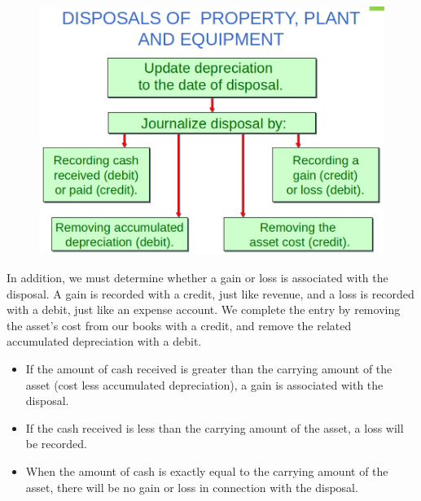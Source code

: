 \documentclass[../main.tex]{subfiles}
\begin{document}
	\begin{figure}[ht]
		\centering
		\includegraphics[width=1\columnwidth]{images/c8/disposal.png}
	\end{figure}
	
	In addition, we must 
	determine whether a gain or loss is associated with the disposal. A gain is 
	recorded with a credit, just like revenue, and a loss is recorded with a 
	debit, just like an expense account. We complete the entry by removing the 
	asset’s cost from our books with a credit, and remove the related 
	accumulated depreciation with a debit.
	\begin{itemize}[noitemsep]
		\item If the amount of cash received is greater than the carrying 
		amount of the asset (cost less accumulated depreciation), a gain is 
		associated with the disposal.
		\item If the cash received is less than the carrying amount of the 
		asset, a loss will be recorded.  
		\item When the amount of cash is exactly equal to the carrying amount 
		of the asset, there will be no gain or loss in connection with the 
		disposal.
	\end{itemize}
\end{document}
